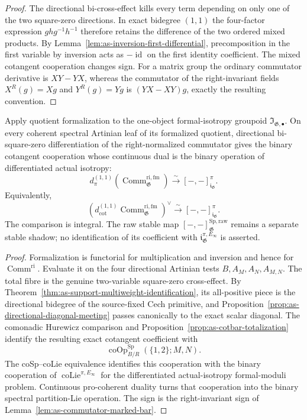 \begin{proof}
The directional bi-cross-effect kills every term depending on only one of the
two square-zero directions.  In exact bidegree $(1,1)$ the four-factor
expression $ghg^{-1}h^{-1}$ therefore retains the difference of the two
ordered mixed products.  By
Lemma~\ref{lem:as-inversion-first-differential}, precomposition in the first
variable by inversion acts as $-\operatorname{id}$ on the first identity
coefficient.  The mixed cotangent cooperation changes sign.  For a matrix
group the ordinary commutator derivative is $XY-YX$, whereas the commutator
of the right-invariant fields $X^R(g)=Xg$ and $Y^R(g)=Yg$ is
$(YX-XY)g$, exactly the resulting convention.
\end{proof}

\begin{theorem}
\label{thm:as-arity-two-comparison}
Apply quotient formalization to the one-object formal-isotropy groupoid
$\mathfrak I_{\mathfrak G,\bullet}$.  On every coherent spectral Artinian leaf
of its formalized quotient, directional bi-square-zero differentiation of the
right-normalized commutator gives the binary cotangent cooperation whose
continuous dual is the binary operation of differentiated actual isotropy:
\[
\boxed{
    d_{\pi}^{(1,1)}
    \left(
        \operatorname{Comm}_{\mathfrak G}^{\mathrm{ri,fm}}
    \right)
    \xrightarrow{\sim}
    [-,-]_{\mathfrak i_{\mathfrak G}}^{\pi}.
}
\]
Equivalently,
\[
\boxed{
    \left(
        d_{\mathrm{cot}}^{(1,1)}
        \operatorname{Comm}_{\mathfrak G}^{\mathrm{ri,fm}}
    \right)^\vee
    \xrightarrow{\sim}
    [-,-]_{\mathfrak i_{\mathfrak G}}^{\pi}.
}
\]
The comparison is integral.  The raw stable map
$[-,-]_{\mathfrak G}^{\mathrm{Sp,raw}}$ remains a separate stable shadow; no
identification of its coefficient with
$\mathfrak i_{\mathfrak G}^{\pi,E_\infty}$ is asserted.
\end{theorem}

\begin{proof}
Formalization is functorial for multiplication and inversion and hence for
$\operatorname{Comm}^{\mathrm{ri}}$.  Evaluate it on the four directional
Artinian tests
$B,A_M,A_N,A_{M,N}$.  The total fibre is the genuine two-variable
square-zero cross-effect.  By
Theorem~\ref{thm:as-support-multiweight-identification}, its all-positive
piece is the directional bidegree of the source-fixed Cech primitive, and
Proposition~\ref{prop:as-directional-diagonal-meeting} passes canonically to
the exact scalar diagonal.  The comonadic Hurewicz comparison and
Proposition~\ref{prop:as-cotbar-totalization} identify the resulting exact
cotangent coefficient with
\[
    \operatorname{coOp}^{\mathrm{Sp}}_{B/R}(\{1,2\};M,N).
\]
The coSp--coLie equivalence identifies this cooperation with the binary
cooperation of $\operatorname{coLie}^{\pi,E_\infty}$ for the differentiated
actual-isotropy formal-moduli problem.  Continuous pro-coherent duality turns
that cooperation into the binary spectral partition-Lie operation.  The sign
is the right-invariant sign of
Lemma~\ref{lem:as-commutator-marked-bar}.
\end{proof}

